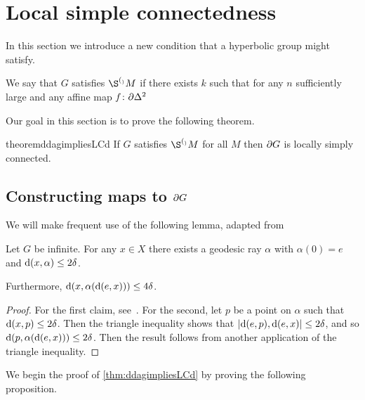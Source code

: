 \documentclass[a4paper]{article}
\begin{document}
\section{Local simple connectedness}

In this section we introduce a new condition that a hyperbolic group might satisfy. 

\begin{definition}
  We say that $G$ satisfies $\Sd_M$ if there exists $k$ such that for any $n$
  sufficiently large and any affine map $f\colon \partial\Delta^2$ 
\end{definition}

Our goal in this section is to prove the following theorem.

\begin{restatable}{theorem}{ddagimpliesLCd}
  If $G$ satisfies $\Sd_M$ for all $M$ then $\partial G$ is locally simply
  connected.
\end{restatable}

\subsection{Constructing maps to $\partial G$}

We will make frequent use of the following lemma, adapted 
from~\cite{bestvinamess91}

\begin{lemma}\cite{bestvinamess91}\label{lem:near_geod_rays}
  Let $G$ be infinite. For any $x \in X$ there exists a geodesic ray $\alpha$ 
  with $\alpha(0) = e$ and $\operatorname{d}(x,\alpha) \leq 2\delta$. 
  
  Furthermore, $\operatorname{d}(x, \alpha(\operatorname{d}(e,x))) \leq 4\delta$.
\end{lemma}

\begin{proof}
  For the first claim, see~\cite{bestvinamess91}. For the second, let $p$ be a 
  point on $\alpha$ such that $\operatorname{d}(x, p) \leq 2\delta$. Then the triangle 
  inequality shows that $\left|\operatorname{d}(e,p), \operatorname{d}(e,x)\right| \leq 2\delta$, and 
  so $\operatorname{d}(p, \alpha(\operatorname{d}(e,x))) \leq 2\delta$. Then the result 
  follows from another application of the triangle inequality.
\end{proof}

We begin the proof of \cref{thm:ddagimpliesLCd} by proving the following 
proposition.
\end{document}
